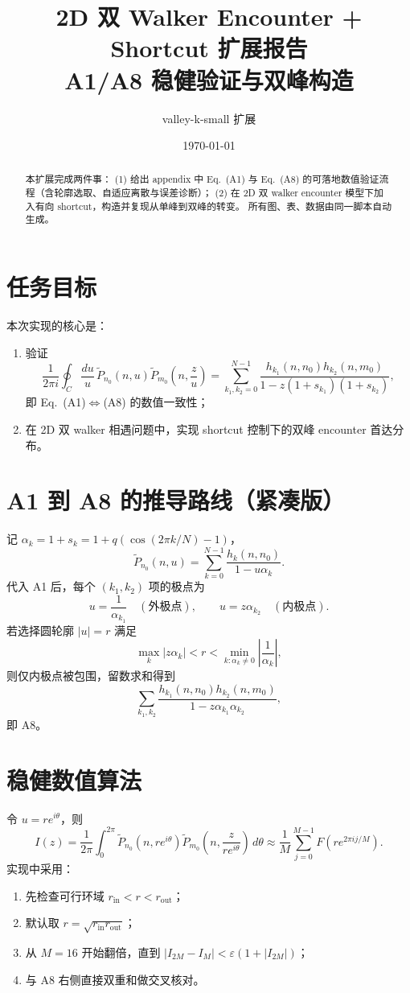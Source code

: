 \documentclass[11pt]{article}
\title{2D 双 Walker Encounter + Shortcut 扩展报告\\\large A1/A8 稳健验证与双峰构造}
\author{valley-k-small 扩展}
\date{\today}
\begin{document}
\maketitle

\begin{abstract}
本扩展完成两件事：
(1) 给出 appendix 中 Eq.~(A1) 与 Eq.~(A8) 的可落地数值验证流程（含轮廓选取、自适应离散与误差诊断）；
(2) 在 2D 双 walker encounter 模型下加入有向 shortcut，构造并复现从单峰到双峰的转变。
所有图、表、数据由同一脚本自动生成。
\end{abstract}

\section{任务目标}
本次实现的核心是：
\begin{enumerate}[leftmargin=1.4em]
  \item 验证
  \[
  \frac{1}{2\pi i}\oint_C\frac{du}{u}\,\widetilde P_{n_0}(n,u)\widetilde P_{m_0}\!\left(n,\frac{z}{u}\right)
  =
  \sum_{k_1,k_2=0}^{N-1}\frac{h_{k_1}(n,n_0)h_{k_2}(n,m_0)}{1-z(1+s_{k_1})(1+s_{k_2})},
  \]
  即 Eq.~(A1)$\Leftrightarrow$(A8) 的数值一致性；
  \item 在 2D 双 walker 相遇问题中，实现 shortcut 控制下的双峰 encounter 首达分布。
\end{enumerate}

\section{A1 到 A8 的推导路线（紧凑版）}
记 $\alpha_k=1+s_k=1+q(\cos(2\pi k/N)-1)$，
\[
\widetilde P_{n_0}(n,u)=\sum_{k=0}^{N-1}\frac{h_k(n,n_0)}{1-u\alpha_k}.
\]
代入 A1 后，每个 $(k_1,k_2)$ 项的极点为
\[
u=\frac{1}{\alpha_{k_1}}\quad(\text{外极点}),\qquad
u=z\alpha_{k_2}\quad(\text{内极点}).
\]
若选择圆轮廓 $|u|=r$ 满足
\[
\max_k|z\alpha_k|<r<\min_{k:\alpha_k\neq0}\left|\frac1{\alpha_k}\right|,
\]
则仅内极点被包围，留数求和得到
\[
\sum_{k_1,k_2}\frac{h_{k_1}(n,n_0)h_{k_2}(n,m_0)}{1-z\alpha_{k_1}\alpha_{k_2}},
\]
即 A8。

\section{稳健数值算法}
令 $u=re^{i\theta}$，则
\[
I(z)=\frac1{2\pi}\int_0^{2\pi}
\widetilde P_{n_0}(n,re^{i\theta})
\widetilde P_{m_0}\!\left(n,\frac{z}{re^{i\theta}}\right)
\,d\theta
\approx
\frac1M\sum_{j=0}^{M-1}F\!\left(re^{2\pi ij/M}\right).
\]
实现中采用：
\begin{enumerate}[leftmargin=1.4em]
  \item 先检查可行环域 $r_{\mathrm{in}}<r<r_{\mathrm{out}}$；
  \item 默认取 $r=\sqrt{r_{\mathrm{in}}r_{\mathrm{out}}}$；
  \item 从 $M=16$ 开始翻倍，直到 $|I_{2M}-I_M|<\varepsilon(1+|I_{2M}|)$；
  \item 与 A8 右侧直接双重和做交叉核对。
\end{enumerate}
\end{document}
